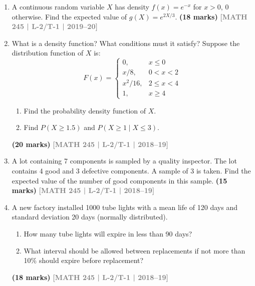 \documentclass[12pt,a4paper]{article}
\newcommand{\yr}[1]{\hfill\textcolor{gray}{\small\textbf{[#1]}}}
\newcommand{\mk}[1]{\textcolor{orange!70!black}{\small\textbf{(#1 marks)}}}
\begin{document}
\begin{enumerate}
\item A continuous random variable $X$ has density $f(x)=e^{-x}$ for $x>0$, $0$ otherwise. Find the expected value of $g(X)=e^{2X/3}$.
\mk{18} \yr{MATH 245 | L-2/T-1 | 2019--20}

\item What is a density function? What conditions must it satisfy? Suppose the distribution function of $X$ is:
\[
F(x)=\begin{cases} 0, & x\le 0 \\ x/8, & 0<x<2 \\ x^{2}/16, & 2\le x<4 \\ 1, & x\ge 4 \end{cases}
\]
\begin{enumerate}
  \item Find the probability density function of $X$.
  \item Find $P(X\ge 1.5)$ and $P(X\ge 1\mid X\le 3)$.
\end{enumerate}
\mk{20} \yr{MATH 245 | L-2/T-1 | 2018--19}

\item A lot containing 7 components is sampled by a quality inspector. The lot contains 4 good and 3 defective components. A sample of 3 is taken. Find the expected value of the number of good components in this sample.
\mk{15} \yr{MATH 245 | L-2/T-1 | 2018--19}

\item A new factory installed 1000 tube lights with a mean life of 120 days and standard deviation 20 days (normally distributed).
\begin{enumerate}
  \item How many tube lights will expire in less than 90 days?
  \item What interval should be allowed between replacements if not more than 10\% should expire before replacement?
\end{enumerate}
\mk{18} \yr{MATH 245 | L-2/T-1 | 2018--19}


\begin{center}
\end{center}
\end{enumerate}
\end{document}
